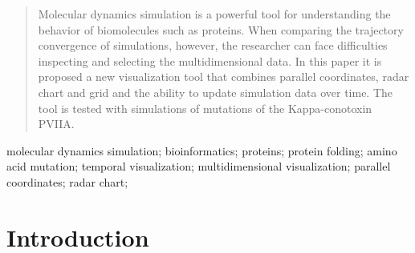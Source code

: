 \documentclass[10pt, conference]{IEEEtran}
\begin{document}
\maketitle


\begin{abstract}

%

Molecular dynamics simulation is a powerful tool for understanding the behavior of biomolecules such as proteins. When comparing the trajectory convergence of simulations, however, the researcher can face difficulties inspecting and selecting the multidimensional data. In this paper it is proposed a new visualization tool that combines parallel coordinates, radar chart and grid and the ability to update simulation data over time. The tool is tested with simulations of mutations of the Kappa-conotoxin PVIIA.     

\end{abstract}

\begin{IEEEkeywords}
molecular dynamics simulation; bioinformatics; proteins; protein folding; amino acid mutation; temporal visualization; multidimensional visualization; parallel coordinates; radar chart;

\end{IEEEkeywords}


\IEEEpeerreviewmaketitle




\section{Introduction}
%
\end{document}

